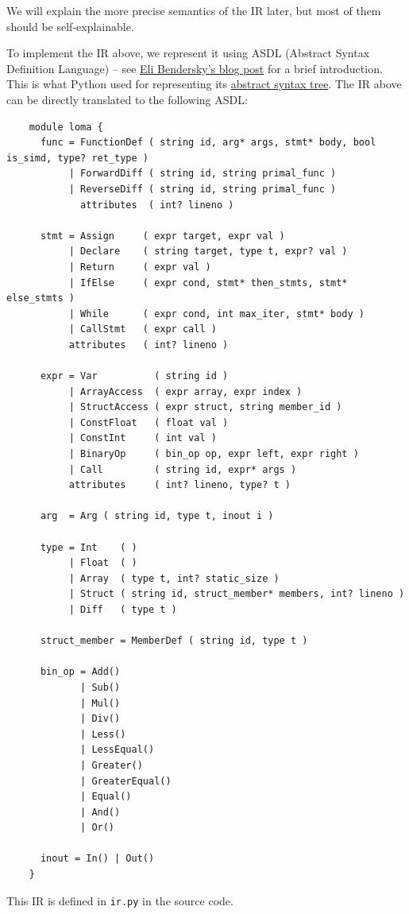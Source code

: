 We will explain the more precise semantics of the IR later, but most of them should be self-explainable.

To implement the IR above, we represent it using ASDL (Abstract Syntax Definition Language) -- see \href{https://eli.thegreenplace.net/2014/06/04/using-asdl-to-describe-asts-in-compilers}{Eli Bendersky's blog post} for a brief introduction. This is what Python used for representing its \href{https://github.com/python/cpython/blob/main/Parser/Python.asdl}{abstract syntax tree}. The IR above can be directly translated to the following ASDL:
\begin{lstlisting}
    module loma {
      func = FunctionDef ( string id, arg* args, stmt* body, bool is_simd, type? ret_type )
           | ForwardDiff ( string id, string primal_func )
           | ReverseDiff ( string id, string primal_func )
             attributes  ( int? lineno )

      stmt = Assign     ( expr target, expr val )
           | Declare    ( string target, type t, expr? val )
           | Return     ( expr val )
           | IfElse     ( expr cond, stmt* then_stmts, stmt* else_stmts )
           | While      ( expr cond, int max_iter, stmt* body )
           | CallStmt   ( expr call )
           attributes   ( int? lineno )

      expr = Var          ( string id )
           | ArrayAccess  ( expr array, expr index )
           | StructAccess ( expr struct, string member_id )
           | ConstFloat   ( float val )
           | ConstInt     ( int val )
           | BinaryOp     ( bin_op op, expr left, expr right )
           | Call         ( string id, expr* args )
           attributes     ( int? lineno, type? t )

      arg  = Arg ( string id, type t, inout i )

      type = Int    ( )
           | Float  ( )
           | Array  ( type t, int? static_size )
           | Struct ( string id, struct_member* members, int? lineno )
           | Diff   ( type t )

      struct_member = MemberDef ( string id, type t )

      bin_op = Add()
             | Sub()
             | Mul()
             | Div()
             | Less()
             | LessEqual()
             | Greater()
             | GreaterEqual()
             | Equal()
             | And()
             | Or()

      inout = In() | Out()
    }
\end{lstlisting}
This IR is defined in \lstinline{ir.py} in the source code.

